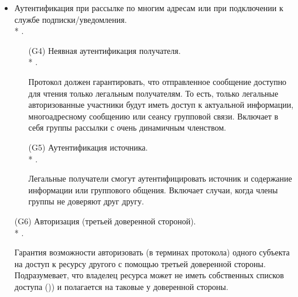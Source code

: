 \begin{itemize}
	\item Аутентификация при рассылке по многим адресам или при подключении к службе подписки/уведомления.\\*
		.
	\begin{itemize}
		\item[(G4)] Неявная аутентификация получателя.\\*
			.
		\item[{}] Протокол должен гарантировать, что отправленное сообщение доступно для чтения только легальным получателям. То есть, только легальные авторизованные участники будут иметь доступ к актуальной информации, многоадресному сообщению или сеансу групповой связи. Включает в себя группы рассылки с очень динамичным членством.
		\item[(G5)] Аутентификация источника.\\*
			.
		\item[{}] Легальные получатели смогут аутентифицировать источник и содержание информации или группового общения. Включает случаи, когда члены группы не доверяют друг другу.
	\end{itemize}

	\item[(G6)] Авторизация (третьей доверенной стороной).\\*
		.
	\item[{}] Гарантия возможности авторизовать (в терминах протокола) одного субъекта на доступ к ресурсу другого с помощью третьей доверенной стороны. Подразумевает, что владелец ресурса может не иметь собственных списков доступа ()) и полагается на таковые у доверенной стороны.


\end{itemize}
